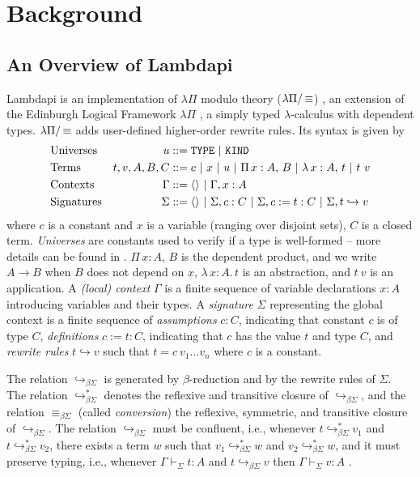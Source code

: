 \section{Background}
\label{sect:background}

\subsection{An Overview of Lambdapi}
\label{ssect:lambdapi-overview}

Lambdapi is an implementation of $\lambda\Pi$ modulo theory ($\lpm$) \cite{lambdapi}, an extension of the Edinburgh Logical Framework $\lambda\Pi$ \cite{lf}, a simply typed $\lambda$-calculus with dependent types. $\lpm$ adds user-defined higher-order rewrite rules. Its syntax is given by
%
\begin{align*}
&\text{Universes}  &u &::= \tt{TYPE} ~|~ \tt{KIND} \\
&\text{Terms}   &t,v, A,B,C &::= c ~|~ x ~|~ u ~|~ \Pi\,x : A,\,B~|~ \lambda\,x : A,\,t ~|~t~v \\
&\text{Contexts}   &\Gamma &::= \langle \rangle ~|~ \Gamma, x : A \\
&\text{Signatures}  &\Sigma &::= \langle \rangle ~|~ \Sigma, c : C ~|~ \Sigma, c := t : C ~|~ \Sigma, t \hookrightarrow v 
\end{align*}
%
where $c$ is a constant and $x$ is a variable  (ranging over disjoint sets), $C$ is a closed term. \emph{Universes} are constants used to verify if a type is well-formed -- more details can be found in \cite[\S 2.1]{lf}. $\Pi\,x : A,\,B$ is the dependent product, and we write $A \rightarrow B$ when $B$ does not depend on $x$, $\lambda\,x : A.\,t$ is an abstraction, and  $t~v$ is an application. A \emph{(local) context} $\Gamma$ is a finite sequence of variable declarations $x:A$ introducing variables and their types.
A \emph{signature} $\Sigma$ representing the global context is a finite sequence of \emph{assumptions} $c : C$, indicating that constant $c$ is of type $C$, \emph{definitions} $c := t : C$, indicating that $c$ has the value $t$ and type $C$, and \emph{rewrite rules} $t \hookrightarrow v$ such that $t = c~v_1 \dots v_n$ where $c$ is a constant.

The relation $\hookrightarrow_{\beta\Sigma}$ is generated by $\beta$-reduction and by the rewrite rules of $\Sigma$. The relation $\hookrightarrow_{\beta\Sigma}^*$ denotes the reflexive and transitive closure of $\hookrightarrow_{\beta\Sigma}$, and the relation $\equiv_{\beta\Sigma}$ (called \emph{conversion}) the reflexive, symmetric, and transitive closure of $\hookrightarrow_{\beta\Sigma}$. 
The relation $\hookrightarrow_{\beta\Sigma}$ must be confluent, i.e.,
whenever $t \hookrightarrow_{\beta\Sigma}^* v_1$ and $t \hookrightarrow_{\beta\Sigma}^* v_2$, there exists a term $w$ such that $v_1 \hookrightarrow_{\beta\Sigma}^* w$ and $v_2 \hookrightarrow_{\beta\Sigma}^* w$, and it must preserve typing, i.e., 
whenever $\Gamma \vdash_\Sigma t: A$ and $t \hookrightarrow_{\beta\Sigma} v$ then $\Gamma \vdash_\Sigma v: A$ \cite{blanqui:LIPIcs.FSCD.2020.13}.

